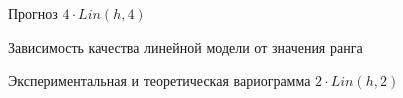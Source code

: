 \begin{figure}[H]
\caption{Прогноз $ 4 \cdot Lin(h, 4) $}
\label{img:lin-fit-cv-pred}
\end{figure}

\begin{figure}[ht]
\caption{Зависимость качества линейной модели от значения ранга}
\label{img:lin-range-adapt}
\end{figure}

\begin{figure}[ht]
\caption{Экспериментальная и теоретическая вариограмма $ 2 \cdot Lin(h, 2) $}
\label{img:lin-adapt-modeled}
\end{figure}

